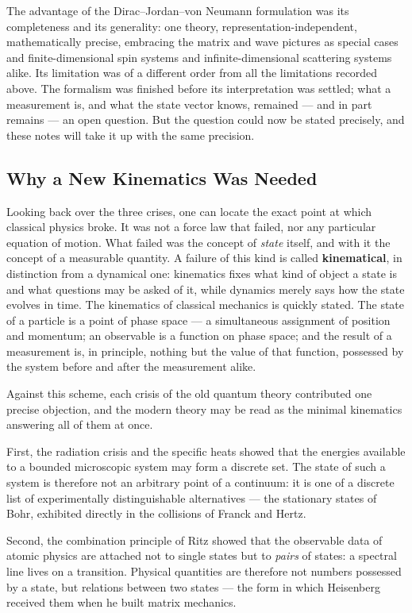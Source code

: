The advantage of the Dirac--Jordan--von Neumann formulation was its completeness and its generality: one theory, representation-independent, mathematically precise, embracing the matrix and wave pictures as special cases and finite-dimensional spin systems and infinite-dimensional scattering systems alike. Its limitation was of a different order from all the limitations recorded above. The formalism was finished before its interpretation was settled; what a measurement is, and what the state vector knows, remained --- and in part remains --- an open question. But the question could now be stated precisely, and these notes will take it up with the same precision.

\subsection{Why a New Kinematics Was Needed}
\label{subsec:why-kinematics}
Looking back over the three crises, one can locate the exact point at which classical physics broke. It was not a force law that failed, nor any particular equation of motion. What failed was the concept of \emph{state} itself, and with it the concept of a measurable quantity. A failure of this kind is called \textbf{kinematical}, in distinction from a dynamical one: kinematics fixes what kind of object a state is and what questions may be asked of it, while dynamics merely says how the state evolves in time. The kinematics of classical mechanics is quickly stated. The state of a particle is a point of phase space --- a simultaneous assignment of position and momentum; an observable is a function on phase space; and the result of a measurement is, in principle, nothing but the value of that function, possessed by the system before and after the measurement alike.

Against this scheme, each crisis of the old quantum theory contributed one precise objection, and the modern theory may be read as the minimal kinematics answering all of them at once.

First, the radiation crisis and the specific heats showed that the energies available to a bounded microscopic system may form a discrete set. The state of such a system is therefore not an arbitrary point of a continuum: it is one of a discrete list of experimentally distinguishable alternatives --- the stationary states of Bohr, exhibited directly in the collisions of Franck and Hertz.

Second, the combination principle of Ritz showed that the observable data of atomic physics are attached not to single states but to \emph{pairs} of states: a spectral line lives on a transition. Physical quantities are therefore not numbers possessed by a state, but relations between two states --- the form in which Heisenberg received them when he built matrix mechanics.


